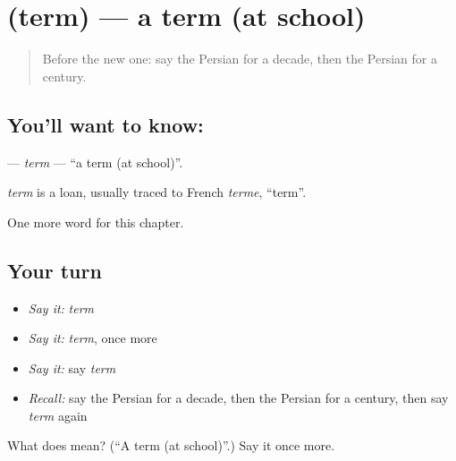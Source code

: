 \section[\texorpdfstring{\fa{ترم} (term)}{ترم (term)}]{ (term) — a term (at school)}

\label{lesson:FA-C265-term}



\begin{quote}
Before the new one: say the Persian for a decade, then the Persian for a century.
\end{quote}

\subsection*{You'll want to know: }
\textbf{} — \emph{term} — \textquotedblleft{}a term (at school)\textquotedblright{}.

\begin{cousinweb}
\emph{term} is a loan, usually traced to French \emph{terme}, \textquotedblleft{}term\textquotedblright{}.
\end{cousinweb}

\begin{grammarlens}[title={What you've built}]
One more word for this chapter.
\end{grammarlens}

\subsection*{Your turn}
\begin{itemize}
\raggedright
  \item \emph{Say it:} \emph{term}
  \item \emph{Say it:} \emph{term}, once more
  \item \emph{Say it:} say \emph{term}
  \item \emph{Recall:} say the Persian for a decade, then the Persian for a century, then say \emph{term} again
\end{itemize}

\begin{tcolorbox}[breakable,colback=teal!4,colframe=teal!35!black,title={Before you move on}]
What does  mean? (\textquotedblleft{}A term (at school)\textquotedblright{}.) Say it once more.
\end{tcolorbox}
